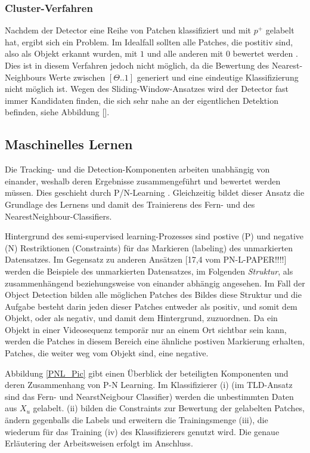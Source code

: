 \subsubsection{Cluster-Verfahren}

Nachdem der Detector eine Reihe von Patchen klassifiziert und mit
$p^{+}$ gelabelt hat, ergibt sich ein Problem. Im Idealfall sollten
alle Patches, die postitiv sind, also als Objekt erkannt wurden, mit
$1$ und alle anderen mit $0$ bewertet werden \cite{BAB}. Dies ist
in diesem Verfahren jedoch nicht möglich, da die Bewertung des Nearest-Neighbours
Werte zwischen $[\Theta..1]$ generiert und eine eindeutige Klassifizierung
nicht möglich ist. Wegen des Sliding-Window-Ansatzes wird der Detector
fast immer Kandidaten finden, die sich sehr nahe an der eigentlichen
Detektion befinden, siehe Abbildung {[}{]}.




\subsection{Maschinelles Lernen}

Die Tracking- und die Detection-Komponenten arbeiten unabhängig von
einander, weshalb deren Ergebnisse zusammengeführt und bewertet werden
müssen. Dies geschieht durch P/N-Learning \cite{PNL}. Gleichzeitig
bildet dieser Ansatz die Grundlage des Lernens und damit des Trainierens
des Fern- und des NearestNeighbour-Classifiers. 

Hintergrund des semi-supervised learning-Prozesses sind postive (P)
und negative (N) Restriktionen (Constraints) für das Markieren (labeling)
des unmarkierten Datensatzes. Im Gegensatz zu anderen Ansätzen {[}17,4
vom PN-L-PAPER!!!!{]} werden die Beispiele des unmarkierten Datensatzes,
im Folgenden \textit{Struktur}, als zusammenhängend beziehungsweise
von einander abhängig angesehen. Im Fall der Object Detection bilden
alle möglichen Patches des Bildes diese Struktur und die Aufgabe besteht
darin jeden dieser Patches entweder als positiv, und somit dem Objekt,
oder als negativ, und damit dem Hintergrund, zuzuordnen. Da ein Objekt
in einer Videosequenz temporär nur an einem Ort sichtbar sein kann,
werden die Patches in diesem Bereich eine ähnliche postiven Markierung
erhalten, Patches, die weiter weg vom Objekt sind, eine negative.

Abbildung \ref{PNL_Pic} gibt einen Überblick der beteiligten Komponenten
und deren Zusammenhang von P-N Learning. Im Klassifizierer (i) (im
TLD-Ansatz sind das Fern- und NearstNeigbour Classifier) werden die
unbestimmten Daten aus $X_{u}$ gelabelt. (ii) bilden die Constraints
zur Bewertung der gelabelten Patches, ändern gegenballs die Labels
und erweitern die Trainingsmenge (iii), die wiederum für das Training
(iv) des Klassifizierers genutzt wird. Die genaue Erläutering der Arbeitsweisen erfolgt im Anschluss.

